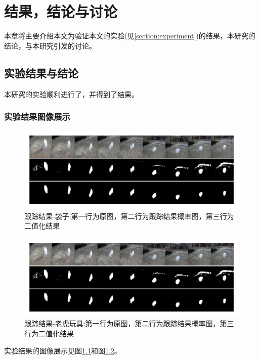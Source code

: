 
\chapter{结果，结论与讨论}
本章将主要介绍本文为验证本文的实验(见\ref{section:experiment})的结果，本研究的结论，与本研究引发的讨论。
\section{实验结果与结论}
本研究的实验顺利进行了，并得到了结果。
\subsection{实验结果图像展示}
\par
\begin{figure}
    \centering
    \includegraphics[width = 1.\textwidth]{chap/img/result_bag.pdf}
    \caption{跟踪结果-袋子:第一行为原图，第二行为跟踪结果概率图，第三行为二值化结果}
    \label{fig:result_bag}
\end{figure}
\par
\begin{figure}
    \centering
    \includegraphics[width = 1.\textwidth]{chap/img/result_bag.pdf}
    \caption{跟踪结果-老虎玩具:第一行为原图，第二行为跟踪结果概率图，第三行为二值化结果}
    \label{fig:result_tiger}
\end{figure}
\par
实验结果的图像展示见图\ref{fig:result_bag}和图\ref{fig:result_tiger}。
\par

